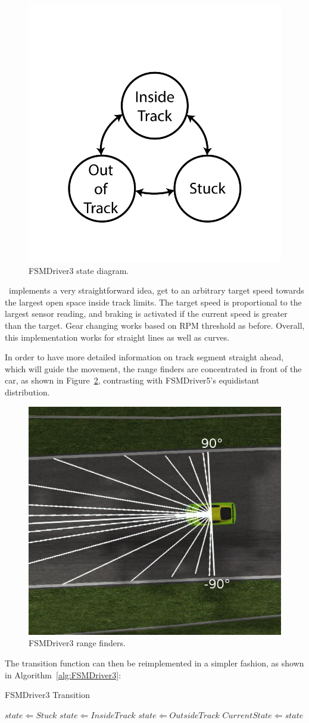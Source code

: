 \begin{figure}[h]
	\centering
	\includegraphics[width=.4\textwidth]{img/ThreeStateFSM}
	\caption{FSMDriver3 state diagram.}
	\label{Fig:FSM3Diagram}
\end{figure}

\IT~implements a very straightforward idea, get to an arbitrary target speed towards the largest open space inside track limits. The target speed is proportional to the largest sensor reading, and braking is activated if the current speed is greater than the target. Gear changing works based on RPM threshold as before. Overall, this implementation works for straight lines as well as curves.

In order to have more detailed information on track segment straight ahead, which will guide the movement, the range finders are concentrated in front of the car, as shown in Figure~\ref{Fig:FSM3Sensors}, contrasting with FSMDriver5's equidistant distribution.

\begin{figure}[h]
	\centering
	\includegraphics[width=.45\textwidth]{img/FSM3Sensors}
	\caption{FSMDriver3 range finders.}
	\label{Fig:FSM3Sensors}
\end{figure}

The transition function can then be reimplemented in a simpler fashion, as shown in Algorithm~\ref{alg:FSMDriver3}:

\begin{algorithm}[h]%
\caption{FSMDriver3 Transition}%
\label{alg:FSMDriver3}%
\begin{algorithmic}
        \STATE $state \Leftarrow Stuck$
    \ELSE
            \STATE $state \Leftarrow Inside Track$
        \ELSE
            \STATE $state \Leftarrow Outside Track$
        \ENDIF
    \ENDIF
        \STATE $Current State \Leftarrow state$
    \ENDIF
\end{algorithmic}
\end{algorithm}

